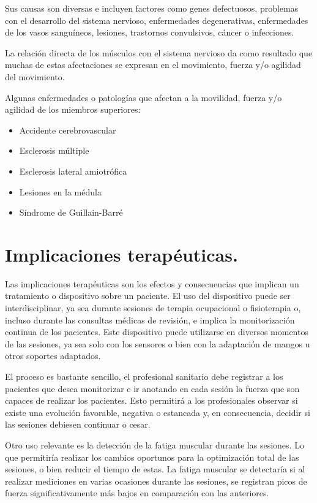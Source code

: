 Sus causas son diversas e incluyen factores como genes defectuosos, problemas con el desarrollo del sistema nervioso, enfermedades degenerativas, enfermedades de los vasos sanguíneos, lesiones, trastornos convulsivos, cáncer o infecciones. \cite{enfermedades_neurológicas}

La relación directa de los músculos con el sistema nervioso da como resultado que muchas de estas afectaciones se expresan en el movimiento, fuerza y/o agilidad del movimiento. 

Algunas enfermedades o patologías que afectan a la movilidad, fuerza y/o agilidad de los miembros superiores: 
\begin{itemize}
    \item Accidente cerebrovascular
    \item Esclerosis múltiple
    \item Esclerosis lateral amiotrófica
    \item Lesiones en la médula
    \item Síndrome de Guillain-Barré
\end{itemize}

\section{Implicaciones terapéuticas.}
Las implicaciones terapéuticas son los efectos y consecuencias que implican un tratamiento o dispositivo sobre un paciente. El uso del dispositivo puede ser interdisciplinar, ya sea durante sesiones de terapia ocupacional o fisioterapia o, incluso durante las consultas médicas de revisión, e implica la monitorización continua de los pacientes. Este dispositivo puede utilizarse en diversos momentos de las sesiones, ya sea solo con los sensores o bien con la adaptación de mangos u otros soportes adaptados.

El proceso es bastante sencillo, el profesional sanitario debe registrar a los pacientes que desea monitorizar e ir anotando en cada sesión la fuerza que son capaces de realizar los pacientes. Esto permitirá a los profesionales observar si existe una evolución favorable, negativa o estancada y, en consecuencia, decidir si las sesiones debiesen continuar o cesar. 

Otro uso relevante es la detección de la fatiga muscular durante las sesiones. Lo que permitiría realizar los cambios oportunos para la optimización total de las sesiones, o bien reducir el tiempo de estas. La fatiga muscular se detectaría si al realizar mediciones en varias ocasiones durante las sesiones, se registran picos de fuerza significativamente más bajos en comparación con las anteriores.

